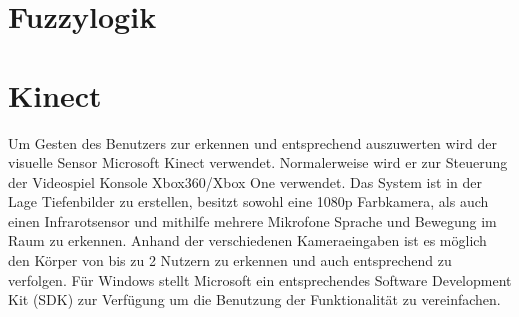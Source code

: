\section{Fuzzylogik}


\section{Kinect}
Um Gesten des Benutzers zur erkennen und entsprechend auszuwerten wird der visuelle Sensor Microsoft Kinect verwendet. Normalerweise wird er zur Steuerung der Videospiel Konsole Xbox360/Xbox One verwendet. Das System ist in der Lage Tiefenbilder zu erstellen, besitzt sowohl eine 1080p Farbkamera, als auch einen Infrarotsensor und mithilfe mehrere Mikrofone Sprache und Bewegung im Raum zu erkennen. Anhand der verschiedenen Kameraeingaben ist es möglich den Körper von bis zu 2 Nutzern zu erkennen und auch entsprechend zu verfolgen. Für Windows stellt Microsoft ein entsprechendes Software Development Kit (SDK) zur Verfügung um die Benutzung der Funktionalität zu vereinfachen.
